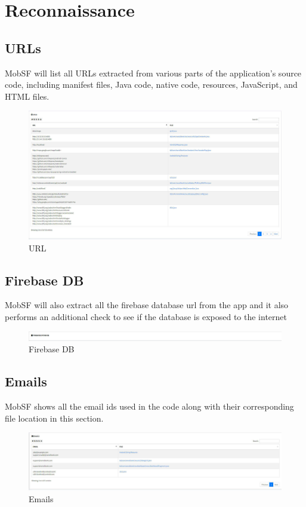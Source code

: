 \documentclass{report}
\begin{document}
\section{Reconnaissance}
\subsection{URLs}
MobSF will list all URLs extracted from various parts of the application's source code, including manifest files, Java code, native code, resources, JavaScript, and HTML files. 
\begin{figure}[hbt!]
    \centering
    \includegraphics[width=1\linewidth]{images/url.jpg}
    \caption{URL}
    \label{fig:example}
\end{figure}
\FloatBarrier

\subsection{Firebase DB}
MobSF will also extract all the firebase database url from the app and it also performs an additional check to see if the database is exposed to the internet
\begin{figure}[hbt!]
    \centering
    \includegraphics[width=1\linewidth]{images/firebase.jpg}
    \caption{Firebase DB}
    \label{fig:example}
\end{figure}
\FloatBarrier

\subsection{Emails}
MobSF shows all the email ids used in the code along with their corresponding file location in this section.
\begin{figure}[hbt!]
    \centering
    \includegraphics[width=1\linewidth]{images/email.jpg}
    \caption{Emails}
    \label{fig:example}
\end{figure}
\FloatBarrier
\end{document}
